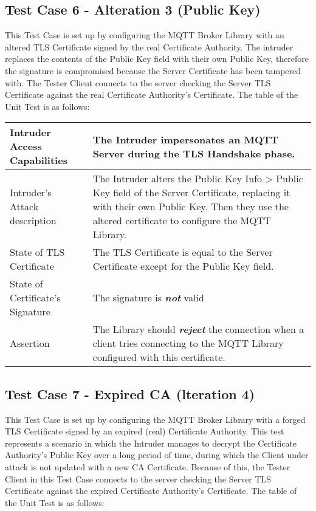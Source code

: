 \documentclass[binding=0.6cm,noexaminfo]{sapthesis}
\begin{document}
\subsection{Test Case 6 - Alteration 3 (Public Key)}
This Test Case is set up by configuring the MQTT Broker Library with an altered TLS Certificate signed by the real Certificate Authority. The intruder replaces the contents of the Public Key field with their own Public Key, therefore the signature is compromised because the Server Certificate has been tampered with. The Tester Client connects to the server checking the Server TLS Certificate against the real Certificate Authority’s Certificate. The table of the Unit Test is as follows:

\begin{center}
\begin{tabular}{| p{6cm} | p{6cm} |}
\hline
Intruder Access Capabilities & The Intruder impersonates an MQTT Server during the TLS Handshake phase. \\
\hline
Intruder’s Attack description & The Intruder alters the Public Key Info > Public Key field of the Server Certificate, replacing it with their own Public Key. Then they use the altered certificate to configure the MQTT Library. \\
\hline
State of TLS Certificate & The TLS Certificate is equal to the Server Certificate except for the Public Key field. \\
\hline
State of Certificate’s Signature & The signature is \textbf{\textit{not}} valid \\
\hline
Assertion & The Library should \textbf{\textit{reject}} the connection when a client tries connecting to the MQTT Library configured with this certificate. \\
\hline
\end{tabular}
\end{center}

\subsection{Test Case 7 - Expired CA (lteration 4)}
This Test Case is set up by configuring the MQTT Broker Library with a forged TLS Certificate signed by an expired (real) Certificate Authority. This test represents a scenario in which the Intruder manages to decrypt the Certificate Authority’s Public Key over a long period of time, during which the Client under attack is not updated with a new CA Certificate. Because of this, the Tester Client in this Test Case connects to the server checking the Server TLS Certificate against the expired Certificate Authority’s Certificate. The table of the Unit Test is as follows:
\end{document}
